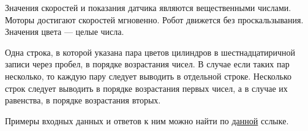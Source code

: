 Значения скоростей и показания датчика являются вещественными числами. Моторы достигают скоростей мгновенно. Робот движется без проскальзывания.
Значения цвета --- целые числа.


\outputfmtSection

Одна строка, в которой указана пара цветов цилиндров в шестнадцатиричной записи через пробел, в порядке возрастания чисел.
В случае если таких пар несколько, то каждую пару следует выводить в отдельной строке.
Несколько строк следует выводить в порядке возрастания первых чисел, а в случае их равенства, в порядке возрастания вторых.


\exampleSection

Примеры входных данных и ответов к ним можно найти по \href{http://bit.ly/2UoC22Z}{данной} сслыке.



